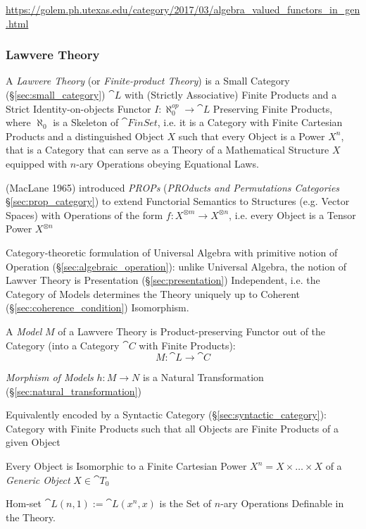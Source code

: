 \url{https://golem.ph.utexas.edu/category/2017/03/algebra_valued_functors_in_gen.html}



\subsubsection{Lawvere Theory}\label{sec:lawvere_theory}

A \emph{Lawvere Theory} (or \emph{Finite-product Theory}) is a Small Category
(\S\ref{sec:small_category}) $\cat{L}$ with (Strictly Associative) Finite
Products and a Strict Identity-on-objects Functor $I : \aleph_0^{op}
\rightarrow \cat{L}$ Preserving Finite Products, where $\aleph_0$ is a Skeleton
of $\cat{FinSet}$, i.e. it is a Category with Finite Cartesian Products and a
distinguished Object $X$ such that every Object is a Power $X^n$, that is a
Category that can serve as a Theory of a Mathematical Structure $X$ equipped
with $n$-ary Operations obeying Equational Laws.

\fist (MacLane 1965) introduced \emph{PROPs} (\emph{PROducts and Permutations
  Categories} \S\ref{sec:prop_category}) to extend Functorial Semantics to
Structures (e.g. Vector Spaces) with Operations of the form $f : X^{\otimes m}
\rightarrow X^{\otimes n}$, i.e. every Object is a Tensor Power $X^{\otimes n}$

Category-theoretic formulation of Universal Algebra with primitive notion of
Operation (\S\ref{sec:algebraic_operation}): unlike Universal Algebra, the
notion of Lawver Theory is Presentation (\S\ref{sec:presentation}) Independent,
i.e. the Category of Models determines the Theory uniquely up to Coherent
(\S\ref{sec:coherence_condition}) Isomorphism. \cite{hyland-power06}

A \emph{Model} $M$ of a Lawvere Theory is Product-preserving Functor
out of the Category (into a Category $\cat{C}$ with Finite Products):
\[
  M : \cat{L} \rightarrow \cat{C}
\]

\emph{Morphism of Models} $h : M \rightarrow N$ is a Natural
Transformation (\S\ref{sec:natural_transformation})

Equivalently encoded by a Syntactic Category
(\S\ref{sec:syntactic_category}): Category with Finite Products such
that all Objects are Finite Products of a given Object

Every Object is Isomorphic to a Finite Cartesian Power $X^n = X \times
\ldots \times X$ of a \emph{Generic Object} $X \in \cat{T}_0$

Hom-set $\cat{L}(n,1) := \cat{L}(x^n,x)$ is the Set of $n$-ary
Operations Definable in the Theory.

